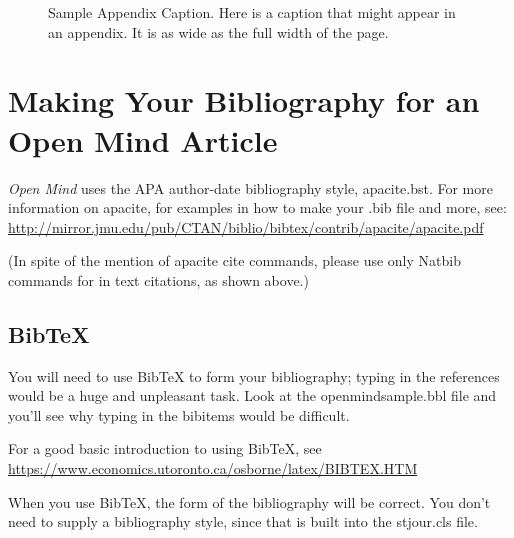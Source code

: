 \documentclass[manuscript]{stjour}
\begin{document}
\begin{figure}
\caption{Sample Appendix Caption. Here is a caption that might
appear in an appendix. It is as wide as the full width of the page.}
\end{figure}

\newpage

\section{Making Your Bibliography for an Open Mind Article}
{\it Open Mind} uses the APA author-date  bibliography style,
apacite.bst. For more
information on apacite, for examples in how to make your .bib file and more, see:\\
\href{http://mirror.jmu.edu/pub/CTAN/biblio/bibtex/contrib/apacite/apacite.pdf}
{http://mirror.jmu.edu/pub/CTAN/biblio/bibtex/contrib/apacite/apacite.pdf}

\noindent
(In spite of the mention of apacite cite commands, please use only
Natbib commands for in text citations, as shown above.)

\subsection{BibTeX}
You will need to use BibTeX to form your bibliography; typing in the
references would be
a huge and unpleasant task. Look at the openmindsample.bbl file and you'll see why
typing in the bibitems would be difficult. 

For a good basic introduction to using BibTeX, see
\href{https://www.economics.utoronto.ca/osborne/latex/BIBTEX.HTM}
{https://www.economics.utoronto.ca/osborne/latex/BIBTEX.HTM}

When you use BibTeX, the form of the bibliography will be correct. You
don't need to supply a bibliography style, since that is built into
the stjour.cls file.
\end{document}
